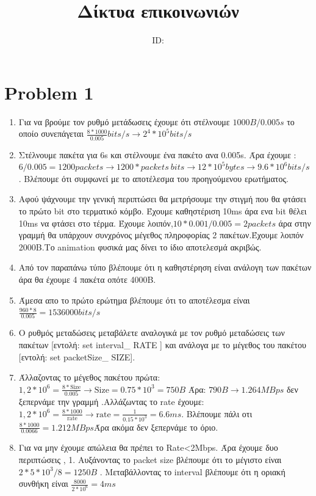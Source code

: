 \documentclass{article}
\title{Δίκτυα επικοινωνιών \\ \exerciseset}
\author{\studentname \qquad  ID: \suid}
\begin{document}
\maketitle

\section*{Problem 1}
\begin{enumerate}
\item %
Για να βρούμε τον ρυθμό μετάδωσεις έχουμε ότι στέλνουμε
$1000B/0.005s$ το οποίο συνεπάγεται $\frac{8*1000}{0.005}bits/s \rightarrow 2^4*10^5bits/s$
\item
Στέλνουμε πακέτα για 6s και στέλνουμε ένα πακέτο ανα 0.005s. Άρα έχουμε :$6/0.005 =1200packets \rightarrow 1200*packets\ bits \rightarrow 12*10^5 bytes \rightarrow 
9.6*10^6 bits/s$ . Βλέπουμε ότι συμφωνεί με το αποτέλεσμα του προηγούμενου ερωτήματος.
\item 
Αφού ψάχνουμε την γενική περιπτώσει θα μετρήσουμε την στιγμή που θα φτάσει το πρώτο bit στο τερματικό κόμβο.
Έχουμε καθηστέριση 10ms άρα ενα bit θέλει 10ms να φτάσει στο τέρμα. Έχουμε λοιπόν,$10*0.001/0.005=2 packets$ άρα στην γραμμή θα υπάρχουν συνχρόνος μέγεθος πληροφορίας 2 πακέτων.Έχουμε λοιπόν 2000B.Το animation φυσικά μας δίνει το ίδιο αποτελεσμά ακριβώς.
\item 
Από τον παραπάνω τύπο βλέπουμε ότι η καθηστέρηση είναι ανάλογη των πακέτων άρα θα έχουμε 4 πακέτα οπότε 4000Β.
\item
Άμεσα απο το πρώτο ερώτημα βλέπουμε ότι το αποτέλεσμα είναι $\frac{960 *8}{0.005}=1536000 bits/s$
\item
Ο ρυθμός μεταδώσεις μεταβάλετε αναλογικά με τον ρυθμό μεταδώσεις των πακέτων  [εντολή: set interval\_ RATE  ] και ανάλογα με το μέγεθος του πακέτου [εντολή: set packetSize\_ SIZE].
\item
Άλλαζοντας το μέγεθος πακέτου πρώτα: $1,2 * 10^6=\frac{8*\text{Size}}{0.005}\rightarrow \text{Size}=0.75 *10^3=750B$ Άρα: $790Β \rightarrow 1.264MBps$ δεν ξεπερνάμε την γραμμή .Αλλάζωντας το rate έχουμε: $1,2 * 10^6=\frac{8*1000}{\text{rate}}\rightarrow \text{rate}=\frac{1}{0.15*10^3}=6.6 ms$. Βλέπουμε πάλι οτι $\frac{8*1000}{0.0066}=1.212MBps$Άρα ακόμα δεν ξεπερνάμε το όριο.
\item
Για να μην έχουμε απώλεια θα πρέπει το Rate<2Mbps. Άρα έχουμε δυο περιπτώσεις , 1. Αυξάνοντας το packet size βλέπουμε ότι το μέγιστο είναι $2*5*10^3/8 =1250B $ . Μεταβάλλοντας το interval βλέπουμε ότι η οριακή συνθήκη είναι $\frac{8000}{2*10^6}=4ms$
\end{enumerate}
\end{document}
